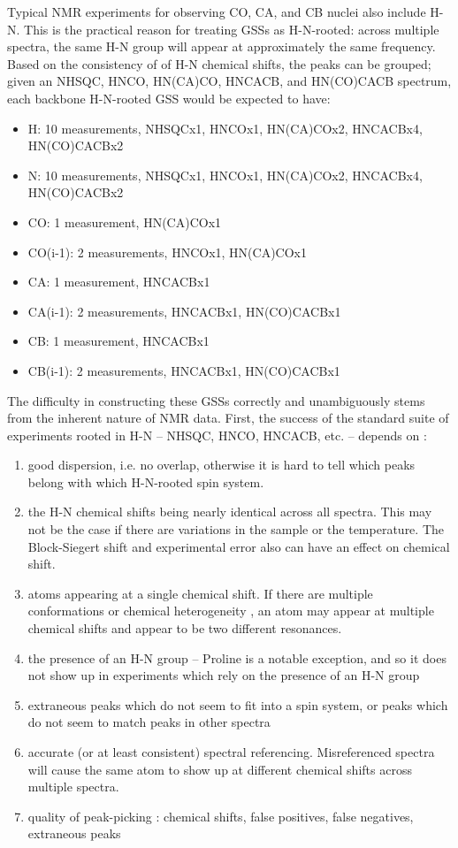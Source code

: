 Typical NMR experiments for observing CO, CA, and CB nuclei also include H-N.  
This is the practical reason for treating GSSs as H-N-rooted: across multiple 
spectra, the same H-N group will appear at approximately the same frequency.  
Based on the consistency of of H-N chemical shifts, the peaks can be grouped; 
given an NHSQC, HNCO, HN(CA)CO, HNCACB, and HN(CO)CACB spectrum, each backbone 
H-N-rooted GSS would be expected to have:
\begin{itemize}
 \item H: 10 measurements, NHSQCx1, HNCOx1, HN(CA)COx2, HNCACBx4, HN(CO)CACBx2
 \item N: 10 measurements, NHSQCx1, HNCOx1, HN(CA)COx2, HNCACBx4, HN(CO)CACBx2
 \item CO: 1 measurement, HN(CA)COx1
 \item CO(i-1): 2 measurements, HNCOx1, HN(CA)COx1
 \item CA: 1 measurement, HNCACBx1
 \item CA(i-1): 2 measurements, HNCACBx1, HN(CO)CACBx1
 \item CB: 1 measurement, HNCACBx1
 \item CB(i-1): 2 measurements, HNCACBx1, HN(CO)CACBx1
\end{itemize}

The difficulty in constructing these GSSs correctly and unambiguously stems 
from the inherent nature of NMR data.  First, the success of the standard 
suite of experiments rooted in H-N -- NHSQC, HNCO, HNCACB, etc. -- depends 
on \cite{autoassign1997}: %
\begin{enumerate}
  \item good dispersion, i.e. no overlap, otherwise it is hard to tell which 
  peaks belong with which H-N-rooted spin system.
  \item the H-N chemical shifts being nearly identical across all spectra.  
  This may not be the case if there are variations in the sample or the 
  temperature.  The Block-Siegert shift and experimental error also can have 
  an effect on chemical shift.
  \item atoms appearing at a single chemical shift.  If there are multiple 
  conformations or chemical heterogeneity \cite{autoassign1997}, 
  an atom may appear at multiple chemical shifts and appear to be two 
  different resonances.
  \item the presence of an H-N group -- Proline is a notable exception, and 
  so it does not show up in experiments which rely on the presence of an H-N group
  \item extraneous peaks which do not seem to fit into a spin system, or 
  peaks which do not seem to match peaks in other spectra
  \item accurate (or at least consistent) spectral referencing.  
  Misreferenced spectra will cause the same atom to show up at different 
  chemical shifts across multiple spectra.
  \item quality of peak-picking \cite{autoassign1997}: 
  chemical shifts, false positives, false negatives, extraneous peaks
\end{enumerate}

